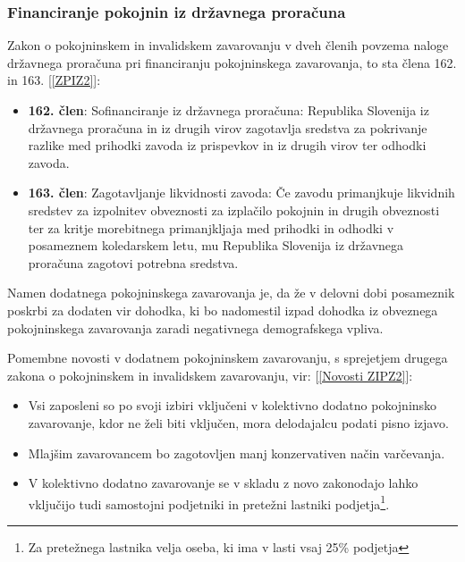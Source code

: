 \documentclass[12pt, a4paper]{article}
\begin{document}
\subsubsection[Financiranje pokojnin iz državnega proračuna]{Financiranje pokojnin iz državnega proračuna}

\hspace*{5mm} Zakon o pokojninskem in invalidskem zavarovanju v dveh členih povzema naloge državnega proračuna pri financiranju pokojninskega zavarovanja, to sta člena 162. in 163. [\ref{ZPIZ2}]:
\begin{itemize}
	\item \textbf{162. člen}: Sofinanciranje iz državnega proračuna: Republika Slovenija iz državnega proračuna in iz drugih virov zagotavlja sredstva za pokrivanje razlike med prihodki zavoda iz prispevkov in iz drugih virov ter odhodki zavoda.
	\item \textbf{163. člen}: Zagotavljanje likvidnosti zavoda: Če zavodu primanjkuje likvidnih sredstev za izpolnitev obveznosti za izplačilo pokojnin in drugih obveznosti ter za kritje morebitnega primanjkljaja med prihodki in odhodki v posameznem koledarskem letu, mu Republika Slovenija iz državnega proračuna zagotovi potrebna sredstva.
\end{itemize}

\hspace*{5mm} Namen dodatnega pokojninskega zavarovanja je, da že v delovni dobi posameznik poskrbi za dodaten vir dohodka, ki bo nadomestil izpad dohodka iz obveznega pokojninskega zavarovanja zaradi negativnega demografskega vpliva.

\hspace*{5mm} Pomembne novosti v dodatnem pokojninskem zavarovanju, s sprejetjem drugega zakona o  pokojninskem in invalidskem zavarovanju, vir: [\ref{Novosti ZIPZ2}]:
\begin{itemize}
	\item Vsi zaposleni so po svoji izbiri vključeni v kolektivno dodatno pokojninsko zavarovanje, kdor ne želi biti vključen, mora delodajalcu podati pisno izjavo.
	\item Mlajšim zavarovancem bo zagotovljen manj konzervativen način varčevanja.
	\item V kolektivno dodatno zavarovanje se v skladu z novo zakonodajo lahko vključijo tudi samostojni podjetniki in pretežni lastniki podjetja\footnote{Za pretežnega lastnika velja oseba, ki ima v lasti vsaj 25\% podjetja}.
\end{itemize}
\end{document}
